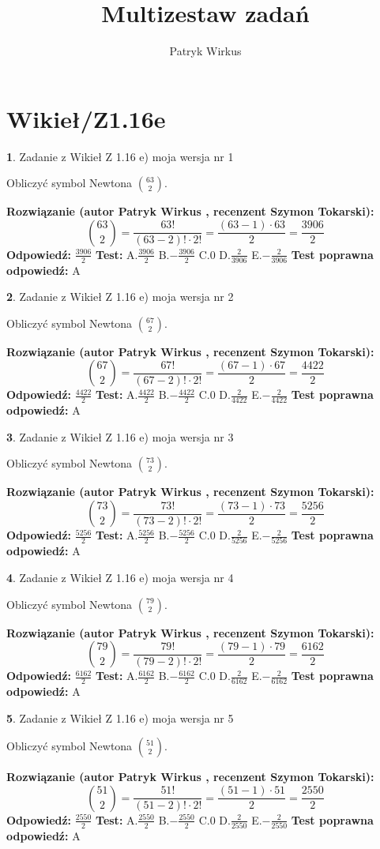\documentclass[12pt, a4paper]{article}
\title{Multizestaw zadań}
\author{Patryk Wirkus}
\date{}
\theoremstyle{definition} %
\newtheorem{zad}{}
\newcommand{\kategoria}[1]{\section{#1}}
\newcommand{\zadStart}[1]{\begin{zad}#1\newline}
\newcommand{\zadStop}{\end{zad}}
\newcommand{\rozwStart}[2]{\noindent \textbf{Rozwiązanie (autor #1 , recenzent #2): }\newline}
\newcommand{\rozwStop}{\newline}
\newcommand{\odpStart}{\noindent \textbf{Odpowiedź:}\newline}
\newcommand{\odpStop}{\newline}
\newcommand{\testStart}{\noindent \textbf{Test:}\newline}
\newcommand{\testStop}{\newline}
\newcommand{\kluczStart}{\noindent \textbf{Test poprawna odpowiedź:}\newline}
\newcommand{\kluczStop}{\newline}
\begin{document}
\maketitle

\kategoria{Wikieł/Z1.16e}


\zadStart{Zadanie z Wikieł Z 1.16 e) moja wersja nr 1}

Obliczyć symbol Newtona ${63 \choose 2}$.
\zadStop
\rozwStart{Patryk Wirkus}{Szymon Tokarski}
$${63 \choose 2} = \frac{63!}{(63-2)! \cdot 2!} = \frac{(63-1) \cdot 63}{2} = \frac{3906}{2}$$
\rozwStop
\odpStart
$\frac{3906}{2}$
\odpStop
\testStart
A.$\frac{3906}{2}$ B.$-\frac{3906}{2}$ C.$0$ D.$\frac{2}{3906}$ E.$-\frac{2}{3906}$
\testStop
\kluczStart
A
\kluczStop



\zadStart{Zadanie z Wikieł Z 1.16 e) moja wersja nr 2}

Obliczyć symbol Newtona ${67 \choose 2}$.
\zadStop
\rozwStart{Patryk Wirkus}{Szymon Tokarski}
$${67 \choose 2} = \frac{67!}{(67-2)! \cdot 2!} = \frac{(67-1) \cdot 67}{2} = \frac{4422}{2}$$
\rozwStop
\odpStart
$\frac{4422}{2}$
\odpStop
\testStart
A.$\frac{4422}{2}$ B.$-\frac{4422}{2}$ C.$0$ D.$\frac{2}{4422}$ E.$-\frac{2}{4422}$
\testStop
\kluczStart
A
\kluczStop



\zadStart{Zadanie z Wikieł Z 1.16 e) moja wersja nr 3}

Obliczyć symbol Newtona ${73 \choose 2}$.
\zadStop
\rozwStart{Patryk Wirkus}{Szymon Tokarski}
$${73 \choose 2} = \frac{73!}{(73-2)! \cdot 2!} = \frac{(73-1) \cdot 73}{2} = \frac{5256}{2}$$
\rozwStop
\odpStart
$\frac{5256}{2}$
\odpStop
\testStart
A.$\frac{5256}{2}$ B.$-\frac{5256}{2}$ C.$0$ D.$\frac{2}{5256}$ E.$-\frac{2}{5256}$
\testStop
\kluczStart
A
\kluczStop



\zadStart{Zadanie z Wikieł Z 1.16 e) moja wersja nr 4}

Obliczyć symbol Newtona ${79 \choose 2}$.
\zadStop
\rozwStart{Patryk Wirkus}{Szymon Tokarski}
$${79 \choose 2} = \frac{79!}{(79-2)! \cdot 2!} = \frac{(79-1) \cdot 79}{2} = \frac{6162}{2}$$
\rozwStop
\odpStart
$\frac{6162}{2}$
\odpStop
\testStart
A.$\frac{6162}{2}$ B.$-\frac{6162}{2}$ C.$0$ D.$\frac{2}{6162}$ E.$-\frac{2}{6162}$
\testStop
\kluczStart
A
\kluczStop



\zadStart{Zadanie z Wikieł Z 1.16 e) moja wersja nr 5}

Obliczyć symbol Newtona ${51 \choose 2}$.
\zadStop
\rozwStart{Patryk Wirkus}{Szymon Tokarski}
$${51 \choose 2} = \frac{51!}{(51-2)! \cdot 2!} = \frac{(51-1) \cdot 51}{2} = \frac{2550}{2}$$
\rozwStop
\odpStart
$\frac{2550}{2}$
\odpStop
\testStart
A.$\frac{2550}{2}$ B.$-\frac{2550}{2}$ C.$0$ D.$\frac{2}{2550}$ E.$-\frac{2}{2550}$
\testStop
\kluczStart
A
\kluczStop
\end{document}
